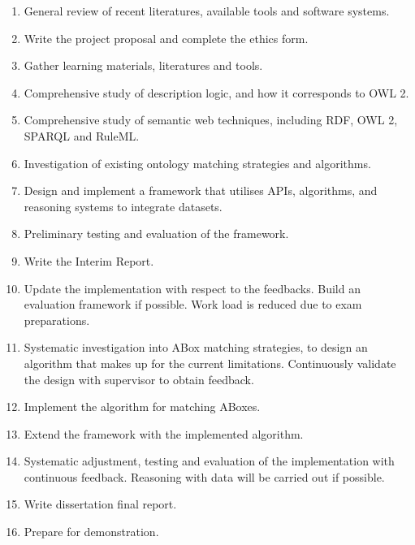 \documentclass[a4paper,12pt,twoside]{article}
\begin{document}
\begin{enumerate}[itemsep=0.1em,label=\Alph*.]
	\item General review of recent literatures, available tools and software systems.
	\item Write the project proposal and complete the ethics form.
	\item Gather learning materials, literatures and tools.
	\item Comprehensive study of description logic, and how it corresponds to OWL 2.
	\item Comprehensive study of semantic web techniques, including RDF, OWL 2, SPARQL and RuleML.
	\item Investigation of existing ontology matching strategies and algorithms.
	\item Design and implement a framework that utilises APIs, algorithms, and reasoning systems to integrate datasets.
	\item Preliminary testing and evaluation of the framework.
	\item Write the Interim Report.
	\item Update the implementation with respect to the feedbacks. Build an evaluation framework if possible. Work load is reduced due to exam preparations.
	\item Systematic investigation into ABox matching strategies, to design an algorithm that makes up for the current limitations. Continuously validate the design with supervisor to obtain feedback.
	\item Implement the algorithm for matching ABoxes.
	\item Extend the framework with the implemented algorithm.
	\item Systematic adjustment, testing and evaluation of the implementation with continuous feedback. Reasoning with data will be carried out if possible.
	\item Write dissertation final report.
	\item Prepare for demonstration.
\end{enumerate}







% 
\end{document}
